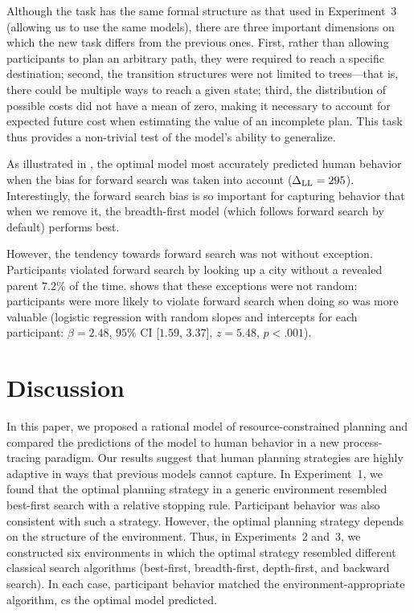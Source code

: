 Although the task has the same formal structure as that used in Experiment~3 (allowing us to use the same models), there are three important dimensions on which the new task differs from the previous ones. First, rather than allowing participants to plan an arbitrary path, they were required to reach a specific destination; second, the transition structures were not limited to trees---that is, there could be multiple ways to reach a given state; third, the distribution of possible costs did not have a mean of zero, making it necessary to account for expected future cost when estimating the value of an incomplete plan. This task thus provides a non-trivial test of the model's ability to generalize.

As illustrated in , the optimal model most accurately predicted human behavior when the bias for forward search was taken into account ($\Delta_{\mathrm{LL}} = 295$). Interestingly, the forward search bias is so important for capturing behavior that when we remove it, the breadth-first model (which follows forward search by default) performs best. 

However, the tendency towards forward search was not without exception. Participants violated forward search by looking up a city without a revealed parent $7.2\%$ of the time.  shows that these exceptions were not random: participants were more likely to violate forward search when doing so was more valuable (logistic regression with random slopes and intercepts for each participant: $\beta = 2.48$, $95\%$ CI [$1.59$, $3.37$], $z = 5.48$, $p < .001$).

\section{Discussion}\label{sec:planning-discussion}

In this paper, we proposed a rational model of resource-constrained planning and compared the predictions of the model to human behavior in a new process-tracing paradigm. Our results suggest that human planning strategies are highly adaptive in ways that previous models cannot capture. In Experiment~1, we found that the optimal planning strategy in a generic environment resembled best-first search with a relative stopping rule. Participant behavior was also consistent with such a strategy. However, the optimal planning strategy depends on the structure of the environment. Thus, in Experiments~2 and~3, we constructed six environments in which the optimal strategy resembled different classical search algorithms (best-first, breadth-first, depth-first, and backward search). In each case, participant behavior matched the environment-appropriate algorithm, cs the optimal model predicted.

